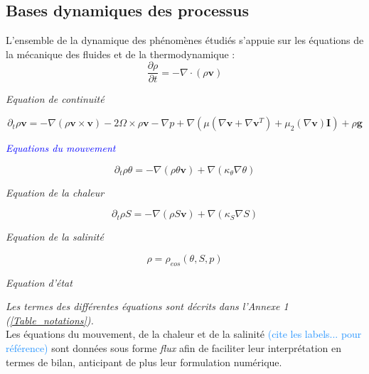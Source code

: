 \documentclass{rapportECC}
\newcommand{\FAadd}[1]{\textcolor{DodgerBlue}{{#1}}}                     %
\begin{document}
\subsection{Bases dynamiques des processus}
\label{Dynamiques globales}
L'ensemble de la dynamique des phénomènes étudiés s'appuie sur les équations de la mécanique des fluides et de la thermodynamique :
\begin{equation}
    \frac{\partial \rho}{\partial t} = - \nabla \cdot (\rho \mathbf{v})
    \label{eq:continuite}
\end{equation}
\begin{center}
    \textit{Equation de continuité}
\end{center}
\begin{equation}
    \partial_t \rho \mathbf{v} = - \nabla (\rho \mathbf{v} \times \mathbf{v}) - 2\Omega \times \rho \mathbf{v} - \nabla p + \nabla (\mu (\nabla\mathbf{v} + \nabla\mathbf{v}^T) + \mu_2(\nabla \mathbf{v}) \mathbf{I}) +\rho \mathbf{g}
    \label{eq: qtt de mouvement}
\end{equation}
\begin{center}
    \textit{\textcolor{blue}{Equations du mouvement}}
\end{center}


\begin{equation}
    \partial_t \rho \theta = -\nabla(\rho\theta\mathbf{v}) + \nabla(\kappa_{\theta}\nabla\theta)
    \label{eq:chaleur}
\end{equation}
\begin{center}
    \textit{Equation de la chaleur}
\end{center}

\begin{equation}
    \partial_t \rho S = -\nabla(\rho S\mathbf{v}) + \nabla(\kappa_S\nabla S)
    \label{eq:salinite}
\end{equation}
\begin{center}
    \textit{Equation de la salinité} 
\end{center}
\begin{equation}
    \rho = \rho_{eos}(\theta , S, p)
    \label{eq:etat}
\end{equation}
\begin{center}
    \textit{Equation d'état}
\end{center}

\textit{Les termes des différentes équations  sont décrits dans l'Annexe 1 (\ref{Table_notations}).}
\\
Les équations du mouvement, de la chaleur et de la salinité \FAadd{(cite les labels... pour référence)} sont données sous forme \textit{flux} afin de faciliter leur interprétation en termes de bilan, anticipant de plus leur formulation numérique. \\
\end{document}

